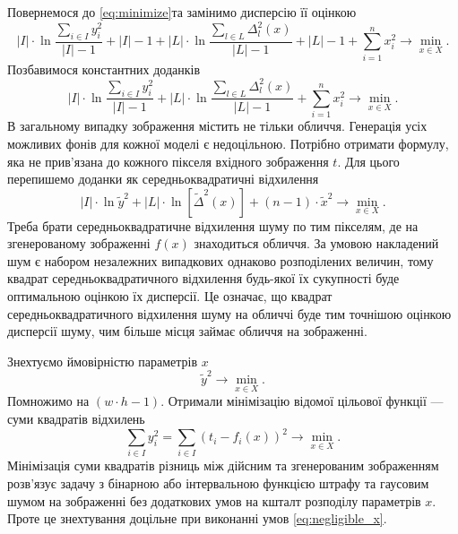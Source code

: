 Повернемося до \eqref{eq:minimize}та замінимо дисперсію її оцінкою
\cite{BorovkovMS}
\begin{equation*}
  \left| I \right|
  \cdot \ln{
    \frac{\sum\limits_{i \in I} y_i^2}
         {\left| I \right| - 1}}
  + \left| I \right| - 1
  + \left| L \right|
  \cdot \ln{
    \frac{\sum\limits_{l \in L} \Delta_l^2\left( x \right)}
         {\left| L \right| - 1}}
  + \left| L \right| - 1
  + \sum_{i = 1}^n x_i^2
  \to \min\limits_{x \in X}.
\end{equation*}
Позбавимося константних доданків
\begin{equation*}
  \left| I \right|
  \cdot \ln{
    \frac{\sum\limits_{i \in I} y_i^2}
         {\left| I \right| - 1}}
  + \left| L \right|
  \cdot \ln{
    \frac{\sum\limits_{l \in L} \Delta_l^2\left( x \right)}
         {\left| L \right| - 1}}
  + \sum_{i = 1}^n x_i^2
  \to \min\limits_{x \in X}.
\end{equation*}
В загальному випадку зображення містить не тільки обличчя.
Генерація усіх можливих фонів для кожної моделі є недоцільною.
Потрібно отримати формулу,
яка не прив'язана до кожного пікселя вхідного зображення $t$.
Для цього перепишемо доданки як середньоквадратичні відхилення
\begin{equation*}
  \left| I \right|
  \cdot \ln{\widetilde{y}^2}
  + \left| L \right|
  \cdot \ln{\left[ \widetilde{\Delta}^2\left( x \right) \right]}
  + \left( n - 1 \right) \cdot \widetilde{x}^2
  \to \min\limits_{x \in X}.
\end{equation*}
Треба брати середньоквадратичне відхилення шуму по тим пікселям,
де на згенерованому зображенні $f\left( x \right)$ знаходиться обличчя.
За умовою накладений шум є
набором незалежних випадкових однаково розподілених величин,
тому квадрат середньоквадратичного відхилення будь-якої їх сукупності
буде оптимальною оцінкою їх дисперсії.
Це означає, що квадрат середньоквадратичного відхилення шуму
на обличчі буде тим точнішою оцінкою дисперсії шуму,
чим більше місця займає обличчя на зображенні.

Знехтуємо ймовірністю параметрів $x$
\begin{equation*}
  \widetilde{y}^2 \to \min\limits_{x \in X}.
\end{equation*}
Помножимо на $\left( w \cdot h - 1 \right)$.
Отримали мінімізацію відомої цільової функції --- суми квадратів відхилень
\begin{equation*}
  \sum_{i \in I} y_i^2
  = \sum_{i \in I} \left( t_i - f_i\left( x \right) \right)^2
  \to \min\limits_{x \in X}.
\end{equation*}
Мінімізація суми квадратів різниць між дійсним та згенерованим зображенням
розв'язує задачу з бінарною або інтервальною функцією штрафу
та гаусовим шумом на зображенні без додаткових умов
на кшталт розподілу параметрів $x$.
Проте це знехтування доцільне при виконанні умов \eqref{eq:negligible_x}.

